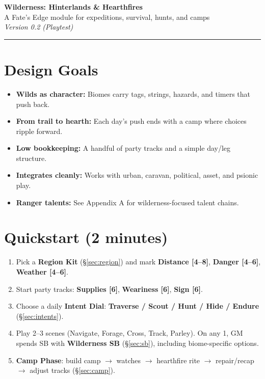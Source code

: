 \documentclass[11pt]{article}
\begin{document}

\begin{center}
{\LARGE \textbf{Wilderness: Hinterlands \& Hearthfires}}\\[3pt]
{\large A Fate's Edge module for expeditions, survival, hunts, and camps}\\[2pt]
\textit{Version 0.2 (Playtest)}
\end{center}
\vspace{0.25em}
\hrule\vspace{0.75em}

\section*{Design Goals}
\begin{itemize}
  \item \textbf{Wilds as character:} Biomes carry tags, strings, hazards, and timers that push back.
  \item \textbf{From trail to hearth:} Each day's push ends with a camp where choices ripple forward.
  \item \textbf{Low bookkeeping:} A handful of party tracks and a simple day/leg structure.
  \item \textbf{Integrates cleanly:} Works with urban, caravan, political, asset, and psionic play.
  \item \textbf{Ranger talents:} See Appendix A for wilderness-focused talent chains.
\end{itemize}

\section*{Quickstart (2 minutes)}
\begin{enumerate}
  \item Pick a \textbf{Region Kit} (\S\ref{sec:region}) and mark \textbf{Distance [4--8]}, \textbf{Danger [4--6]}, \textbf{Weather [4--6]}.
  \item Start party tracks: \textbf{Supplies [6]}, \textbf{Weariness [6]}, \textbf{Sign [6]}.
  \item Choose a daily \textbf{Intent Dial}: \textbf{Traverse / Scout / Hunt / Hide / Endure} (\S\ref{sec:intents}).
  \item Play 2--3 scenes (Navigate, Forage, Cross, Track, Parley). On any 1, GM spends SB with \textbf{Wilderness SB} (\S\ref{sec:sb}), including biome-specific options.
  \item \textbf{Camp Phase}: build camp $\to$ watches $\to$ hearthfire rite $\to$ repair/recap $\to$ adjust tracks (\S\ref{sec:camp}).
\end{enumerate}
\end{document}
